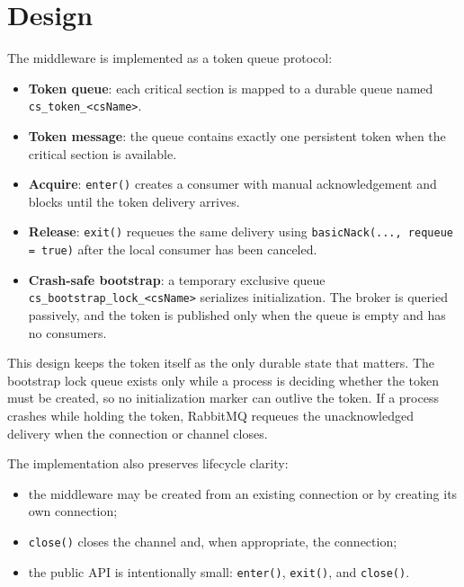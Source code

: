 \documentclass[11pt,a4paper]{article}
\begin{document}
\section{Design}
The middleware is implemented as a token queue protocol:
\begin{itemize}
    \item \textbf{Token queue}: each critical section is mapped to a durable queue named
    \texttt{cs\_token\_<csName>}.
    \item \textbf{Token message}: the queue contains exactly one persistent token when the critical section is
    available.
    \item \textbf{Acquire}: \texttt{enter()} creates a consumer with manual acknowledgement and blocks until the
    token delivery arrives.
    \item \textbf{Release}: \texttt{exit()} requeues the same delivery using \texttt{basicNack(..., requeue = true)}
    after the local consumer has been canceled.
    \item \textbf{Crash-safe bootstrap}: a temporary exclusive queue \texttt{cs\_bootstrap\_lock\_<csName>} serializes
    initialization. The broker is queried passively, and the token is published only when the queue is empty and
    has no consumers.
\end{itemize}

This design keeps the token itself as the only durable state that matters. The bootstrap lock queue exists only
while a process is deciding whether the token must be created, so no initialization marker can outlive the token.
If a process crashes while holding the token, RabbitMQ requeues the unacknowledged delivery when the connection
or channel closes.

The implementation also preserves lifecycle clarity:
\begin{itemize}
    \item the middleware may be created from an existing connection or by creating its own connection;
    \item \texttt{close()} closes the channel and, when appropriate, the connection;
    \item the public API is intentionally small: \texttt{enter()}, \texttt{exit()}, and \texttt{close()}.
\end{itemize}
\end{document}
